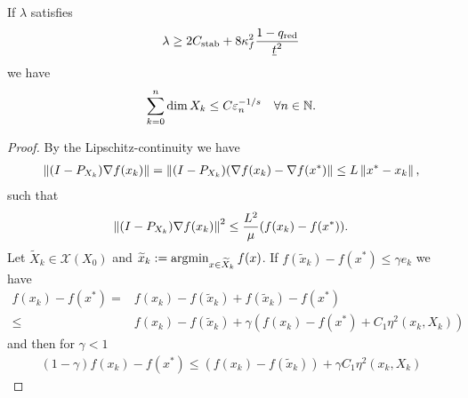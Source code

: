 %
\begin{theorem}\label{thm:}
If $\lambda$ satisfies
%
\begin{equation}\label{eq:}
\lambda \ge 2C_{\rm stab} + 8\kappa_f^2\frac{1-q_{\rm red}}{\underline{t}^2} 
\end{equation}
%
we have
%
\begin{align*}
\sum_{k=0}^n \dim X_k \le C \varepsilon_n^{-1/s}\quad \forall n\in\mathbb N.
\end{align*}
%
\end{theorem}
%
\begin{proof}
%
By the Lipschitz-continuity we have
%
\begin{align*}
\left\|(I-P_{X_k})\nabla f(x_k)\right\| = \left\|(I-P_{X_k})(\nabla f(x_k)-\nabla f(x^*)\right\|
\le L \left\|x^*-x_k\right\|,
\end{align*}
%
such that
%
\begin{align*}
\left\|(I-P_{X_k})\nabla f(x_k)\right\|^2 \le \frac{L^2}{\mu} (f(x_k) - f(x^*)). 
\end{align*}
%
Let  $\widetilde{X}_k\in \mathcal X(X_0)$ and $\widetilde{x}_k:=\operatorname*{argmin}_{x\in \widetilde{X}_k}f(x)$.
If $f(\widetilde{x}_k) - f(x^*)\le \gamma e_k$ we have
%
\begin{align*}
f(x_k) - f(x^*) =& f(x_k) - f(\widetilde{x}_k) + f(\widetilde{x}_k) - f(x^*)\\
\le& f(x_k) - f(\widetilde{x}_k) + \gamma(f(x_k) - f(x^*) + C_1\eta^2(x_k,X_k))
\end{align*}
%
and then for $\gamma <1$
%
\begin{align*}
(1-\gamma) f(x_k) - f(x^*) \le (f(x_k) - f(\widetilde{x}_k)) + \gamma C_1\eta^2(x_k,X_k)
\end{align*}
%



\end{proof}
